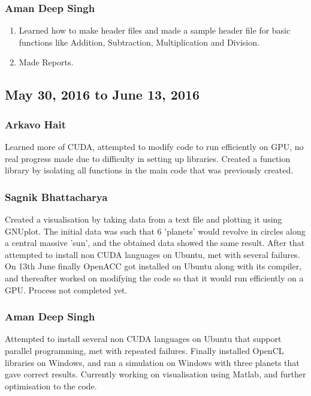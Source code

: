 \documentclass{article}
\begin{document}
\subsubsection*{Aman Deep Singh}
\begin{enumerate}
    \item Learned how to make header files and made a sample header file for basic functions like  Addition, Subtraction, Multiplication and Division.
    \item Made Reports.
\end{enumerate}
\subsection*{May 30, 2016 to June 13, 2016}
\subsubsection*{Arkavo Hait}
	Learned more of CUDA, attempted to modify code to run efficiently on GPU, no real progress made due to difficulty in setting up libraries.
	Created a function library by isolating all functions in the main code that was previously created.
\subsubsection*{Sagnik Bhattacharya}
	Created a visualisation by taking data from a text file and plotting it using GNUplot. The initial data was such that 6 'planets' would revolve in circles along a central massive 'sun', and the obtained data showed the same result. 
	After that attempted to install non CUDA languages on Ubuntu, met with several failures. On 13th June finally OpenACC got installed on Ubuntu along with its compiler, and thereafter worked on modifying the code so that it would run efficiently on a GPU. Process not completed yet.
\subsubsection*{Aman Deep Singh}
	Attempted to install several non CUDA languages on Ubuntu that support parallel programming, met with repeated failures. Finally installed OpenCL libraries on Windows, and ran a simulation on Windows with three planets that gave correct results. Currently working on visualisation using Matlab, and further optimisation to the code.

\begin{comment}
\section{What we will do}
Convert the C code to CUDA code to be essential in Parallel computing
Create a GUI to make things visual.
Add other forces and their effects in the future.
We are still workin on the basics of CUDA programming and will covert it to CUDA language soon.
Converting the initial code to a function library to ease up the process and debugging
\end{comment}
\end{document}
